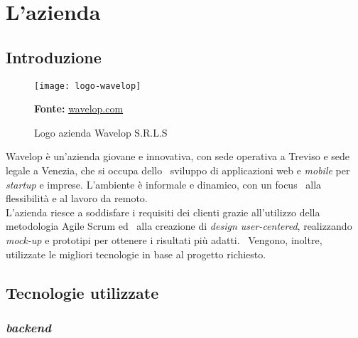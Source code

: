
\chapter{L'azienda}
\label{cap:azienda}
\section{Introduzione}

\vspace{20pt}
  \begin{figure}[!ht]
    \begin{center}
      \texttt{[image: logo-wavelop]}
      \caption{Logo azienda Wavelop S.R.L.S}
      \textbf{Fonte:} \href{https://www.wavelop.com}{wavelop.com}
    \end{center}
  \end{figure}
\vspace{20pt} 

Wavelop è un’azienda giovane e innovativa, con sede operativa a Treviso e sede legale a Venezia, che si occupa dello \
sviluppo di applicazioni web e \emph{mobile} per \emph{startup} e imprese. L’ambiente è informale e dinamico, con un focus \
alla flessibilità e al lavoro da remoto. \\

L’azienda riesce a soddisfare i requisiti dei clienti grazie all’utilizzo della metodologia Agile Scrum ed \
alla creazione di \emph{design user-centered}, realizzando \emph{\gls{mock-up}} e prototipi per ottenere i risultati più adatti. \
Vengono, inoltre, utilizzate le migliori tecnologie in base al progetto richiesto.

\section{Tecnologie utilizzate}

\subsection{\emph{\Gls{backend}}}

